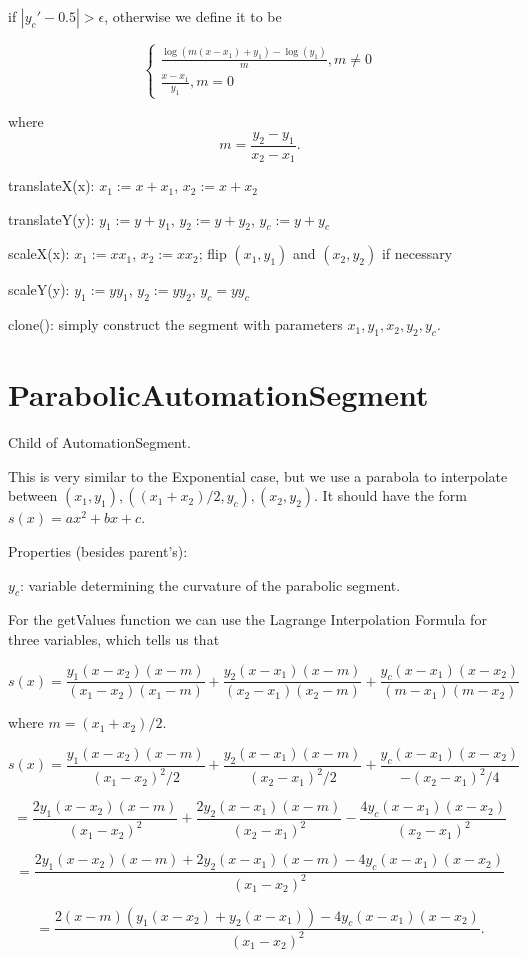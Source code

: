 \documentclass{article}
\begin{document}
if $|y_c'-0.5| > \epsilon$, otherwise we define it to be

$$\begin{cases}
\frac{\log(m(x-x_1)+y_1)-\log(y_1)}{m}, m\neq 0 \\
\frac{x-x_1}{y_1}, m = 0
\end{cases}$$

where $$m=\frac{y_2-y_1}{x_2-x_1}.$$

translateX(x): $x_1:=x+x_1$, $x_2:=x+x_2$

translateY(y): $y_1:=y+y_1$, $y_2:=y+y_2$, $y_c:=y+y_c$

scaleX(x): $x_1:=xx_1$, $x_2:=xx_2$; flip $(x_1, y_1)$ and $(x_2, y_2)$ if necessary

scaleY(y): $y_1:=yy_1$, $y_2:=yy_2$, $y_c=yy_c$

clone(): simply construct the segment with parameters $x_1, y_1, x_2, y_2, y_c$.

\section{ParabolicAutomationSegment}

Child of AutomationSegment.

This is very similar to the Exponential case, but we use a parabola to interpolate between $(x_1, y_1), ((x_1+x_2)/2, y_c), (x_2, y_2)$. It should have the form $s(x) = ax^2+bx+c$.

Properties (besides parent's):

$y_c$: variable determining the curvature of the parabolic segment.

For the getValues function we can use the Lagrange Interpolation Formula for three variables, which tells us that

$$s(x) = \frac{y_1(x-x_2)(x-m)}{(x_1-x_2)(x_1-m)}+\frac{y_2(x-x_1)(x-m)}{(x_2-x_1)(x_2-m)}+\frac{y_c(x-x_1)(x-x_2)}{(m-x_1)(m-x_2)}$$

where $m=(x_1+x_2)/2$.

$$s(x) = \frac{y_1(x-x_2)(x-m)}{(x_1-x_2)^2/2}+\frac{y_2(x-x_1)(x-m)}{(x_2-x_1)^2/2}+\frac{y_c(x-x_1)(x-x_2)}{-(x_2-x_1)^2/4}$$

$$= \frac{2y_1(x-x_2)(x-m)}{(x_1-x_2)^2}+\frac{2y_2(x-x_1)(x-m)}{(x_2-x_1)^2}-\frac{4y_c(x-x_1)(x-x_2)}{(x_2-x_1)^2}$$

$$= \frac{2y_1(x-x_2)(x-m) + 2y_2(x-x_1)(x-m) - 4y_c(x-x_1)(x-x_2)}{(x_1-x_2)^2}$$

$$= \frac{2(x-m)(y_1(x-x_2)+y_2(x-x_1)) - 4y_c(x-x_1)(x-x_2)}{(x_1-x_2)^2}.$$
\end{document}
